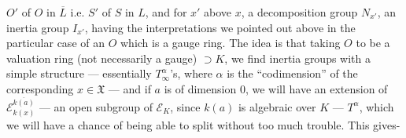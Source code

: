 $O'$ of $O$ in $\overline L$ i.e. $S'$ of $S$ in $L$, and for $x'$ above $x$, a decomposition group $N_{x'}$, an inertia group $I_{x'}$, having the interpretations we pointed out above in the particular case of an $O$ which is a gauge ring. The idea is that taking $O$ to be a valuation ring (not necessarily a gauge) $\supset K$, we find inertia groups with a simple structure ---
essentially $T_\infty^\alpha$'s, where $\alpha$ is the ``codimension'' of the corresponding $x\in\mathfrak X$ --- and if $a$ is of dimension $0$, we will have an extension of $\mathcal E_{k(x)}^{\overline{k(a)}}$ --- an open subgroup of $\mathcal E_K$, since
$k(a)$ is  algebraic over $K$ ---  $T^\alpha$, which we will have a chance of being able to split without too much trouble. This gives-
